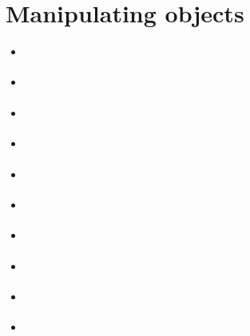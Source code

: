 \documentclass[a4paper,12pt,english]{sphinxhowto}
\begin{document}
\section{Manipulating  objects}
\label{\detokenize{tutorial:manipulating-digraph-objects}}\label{\detokenize{tutorial:digraph-tools-label}}
\begin{sphinxShadowBox}
\begin{itemize}
\item {} 
\label{\detokenize{tutorial:id164}}{\hyperref[\detokenize{tutorial:random-digraph}]{}}

\item {} 
\label{\detokenize{tutorial:id165}}{\hyperref[\detokenize{tutorial:graphviz-drawings}]{}}

\item {} 
\label{\detokenize{tutorial:id166}}{\hyperref[\detokenize{tutorial:asymmetric-and-symmetric-parts}]{}}

\item {} 
\label{\detokenize{tutorial:id167}}{\hyperref[\detokenize{tutorial:border-and-inner-parts}]{}}

\item {} 
\label{\detokenize{tutorial:id168}}{\hyperref[\detokenize{tutorial:fusion-by-epistemic-disjunction}]{}}

\item {} 
\label{\detokenize{tutorial:id169}}{\hyperref[\detokenize{tutorial:dual-converse-and-codual-digraphs}]{}}

\item {} 
\label{\detokenize{tutorial:id170}}{\hyperref[\detokenize{tutorial:symmetric-and-transitive-closures}]{}}

\item {} 
\label{\detokenize{tutorial:id171}}{\hyperref[\detokenize{tutorial:strong-components}]{}}

\item {} 
\label{\detokenize{tutorial:id172}}{\hyperref[\detokenize{tutorial:csv-storage}]{}}

\item {} 
\label{\detokenize{tutorial:id173}}{\hyperref[\detokenize{tutorial:complete-empty-and-indeterminate-digraphs}]{}}

\end{itemize}
\end{sphinxShadowBox}
\end{document}
